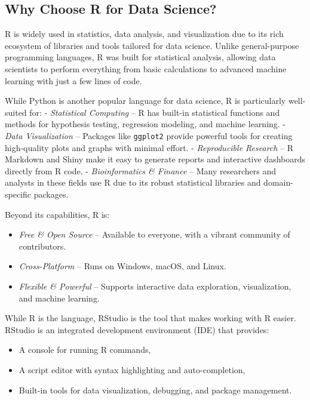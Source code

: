 \documentclass[
]{book}
\newcommand{\passthrough}[1]{#1}
\providecommand{\tightlist}{%
  \setlength{\itemsep}{0pt}\setlength{\parskip}{0pt}}
\theoremstyle{definition}
\theoremstyle{definition}
\theoremstyle{definition}
\theoremstyle{definition}
\theoremstyle{remark}
\begin{document}
\subsection*{Why Choose R for Data Science?}\label{why-choose-r-for-data-science}

R is widely used in statistics, data analysis, and visualization due to its rich ecosystem of libraries and tools tailored for data science. Unlike general-purpose programming languages, R was built for statistical analysis, allowing data scientists to perform everything from basic calculations to advanced machine learning with just a few lines of code.

While Python is another popular language for data science, R is particularly well-suited for:
- \emph{Statistical Computing} -- R has built-in statistical functions and methods for hypothesis testing, regression modeling, and machine learning.
- \emph{Data Visualization} -- Packages like \passthrough{\lstinline!ggplot2!} provide powerful tools for creating high-quality plots and graphs with minimal effort.
- \emph{Reproducible Research} -- R Markdown and Shiny make it easy to generate reports and interactive dashboards directly from R code.
- \emph{Bioinformatics \& Finance} -- Many researchers and analysts in these fields use R due to its robust statistical libraries and domain-specific packages.

Beyond its capabilities, R is:

\begin{itemize}
\tightlist
\item
  \emph{Free \& Open Source} -- Available to everyone, with a vibrant community of contributors.
\item
  \emph{Cross-Platform} -- Runs on Windows, macOS, and Linux.
\item
  \emph{Flexible \& Powerful} -- Supports interactive data exploration, visualization, and machine learning.
\end{itemize}

While R is the language, RStudio is the tool that makes working with R easier. RStudio is an integrated development environment (IDE) that provides:

\begin{itemize}
\tightlist
\item
  A console for running R commands,\\
\item
  A script editor with syntax highlighting and auto-completion,\\
\item
  Built-in tools for data visualization, debugging, and package management.
\end{itemize}
\end{document}
